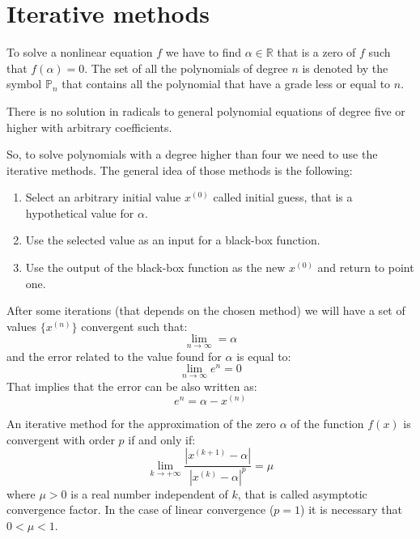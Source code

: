 \documentclass[12pt, a4paper]{report}
\newtheorem[style=M,bodystyle=\normalfont]{theorem}{Theorem}
\newtheorem[style=M,bodystyle=\normalfont]{corollary}{Corollary}
\newtheorem[style=M,bodystyle=\normalfont]{lemma}{Lemma}
\newtheorem[style=M,bodystyle=\normalfont]{definition}{Definition}
\begin{document}
    \section{Iterative methods}
    To solve a nonlinear equation $f$ we have to find $\alpha \in \mathbb{R}$ that is a zero of $f$ such that $f(\alpha)=0$. The set of all the 
    polynomials of degree $n$ is denoted by the symbol $\mathbb{P}_n$ that contains all the polynomial that have a grade less or equal to $n$.
    \begin{theorem}
        There is no solution in radicals to general polynomial equations of degree five or higher with arbitrary coefficients. 
    \end{theorem}
    So, to solve polynomials with a degree higher than four we need to use the iterative methods. The general idea of those methods is the following:
    \begin{enumerate}
        \item Select an arbitrary initial value $x^{(0)}$ called initial guess, that is a hypothetical value for $\alpha$.
        \item Use the selected value as an input for a black-box function.
        \item Use the output of the black-box function as the new $x^{(0)}$ and return to point one. 
    \end{enumerate}
    After some iterations (that depends on the chosen method) we will have a set of values $\{ x^{(n)} \}$ convergent such that:
    \[ \lim_{n \rightarrow \infty} = \alpha\]
    and the error related to the value found for $\alpha$ is equal to: 
    \[ \lim_{n \rightarrow \infty}e^n = 0\]
    That implies that the error can be also written as: 
    \[e^n=\alpha-x^{(n)}\]
    \begin{definition}
        An iterative method for the approximation of the zero $\alpha$ of the function $f(x)$ is convergent with order $p$ if and only if:
        \[\lim_{k \rightarrow + \infty}\dfrac{\left\lvert x^{(k+1)}-\alpha \right\rvert}{\left\lvert x^{(k)}-\alpha \right\rvert^p}=\mu\]
        where $\mu > 0$ is a real number independent of $k$, that is called asymptotic convergence factor. In the case of linear convergence 
        ($p=1$) it is necessary that $0<\mu<1$.
    \end{definition}
\end{document}
